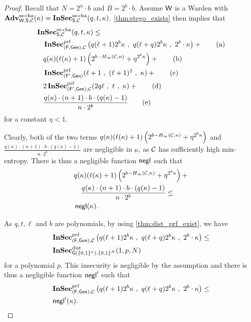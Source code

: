  \begin{proof}
  Recall that $N=2^{n}\cdot b$ and $B=2^{b}\cdot b$.
   Assume  $\operatorname{\mathsf{W}}$ is a Warden with
   $\operatorname{\mathbf{Adv}}^{\operatorname{ss-cha}}_{\operatorname{\mathsf{W}},\operatorname{\mathsf{S}},\mathcal{C}}(\kappa)=\operatorname{\mathbf{InSec}}^{\operatorname{ss-cha}}_{\operatorname{\mathsf{S}},\mathcal{C}}(q,t,\kappa)$. 
   \autoref{thm:stego_exists} then implies that
    \begin{align*}
      &\InSec^{\sscha}_{\Steg,\chan}(q,t,\kappa) \leq\\
      &\quad \InSec^{\prf}_{(\algf,\Gen),\chan}\left(q(\ell+1)2^{b}\kappa\ ,\
        q(\ell+q)2^{b}\kappa\ ,\ 2^{b}\cdot \kappa\right)+ \tag{a}\\
      &\quad q(\kappa)(\ell(\kappa)+1)\left(2^{b-\minent(\chan,n)}+\eta^{2^{b}\kappa}\right)+\tag{b}\\
      &\quad \InSec^{\prf}_{(\algf',\Gen)}(\ell+1\ ,\ (\ell+1)^{2}\ ,\ \kappa)  +\tag{c}\\
      &\quad 2\InSec^{\prf}_{(\algf',\Gen),\chan}(2q\ell\ ,\ t\ ,\ \kappa) +\tag{d}\\
      &\quad \frac{q(\kappa)\cdot (n+1)\cdot b\cdot 
        (q(\kappa)-1)}{n\cdot 2^{b}} \tag{e}
    \end{align*}
    for a constant $\eta < 1$. 

    Clearly, both of the two terms
    $q(\kappa)(\ell(\kappa)+1)\left(2^{b-H_{\infty}(\mathcal{C},n)}+\eta^{2^{b}\kappa}\right)$
    and
    $\frac{q(\kappa)\cdot (n+1)\cdot b\cdot (q(\kappa)-1)}{n\cdot
      2^{b}}$ are negligible in $\kappa$, as $\mathcal{C}$ has sufficiently high
    min-entropy. There is thus a negligible function $\operatorname{\mathsf{negl}}$ such that
 \begin{align*}
   &q(\kappa)(\ell(\kappa)+1)\left(2^{b-H_{\infty}(\mathcal{C},n)}+\eta^{2^{b}\kappa}\right)+\\
   &\quad\frac{q(\kappa)\cdot (n+1)\cdot b\cdot 
        (q(\kappa)-1)}{n\cdot 2^{b}} \leq\\
   &\operatorname{\mathsf{negl}}(\kappa).
 \end{align*}

 As $q,t,\ell$ and $b$ are polynomials, by using
 \autoref{thm:dist_prf_exist}, we have
 \begin{align*}
      &\InSec^{\prf}_{(\algf,\Gen),\chan}\left(q(\ell+1)2^{b}\kappa\ ,\
        q(\ell+q)2^{b}\kappa\ ,\ 2^{b}\cdot \kappa\right)\leq\\
   &\InSec^{\dist}_{\algo{G}(\{0,1\}^{\kappa}),\{0,1\}^{N}}(1,p,N)
 \end{align*}
for a polynomial $p$.
This insecurity is negligible by the assumption and there is thus a
negligible function $\operatorname{\mathsf{negl}}'$ such that
\begin{align*}
      &\InSec^{\prf}_{(\algf,\Gen),\chan}\left(q(\ell+1)2^{b}\kappa\ ,\
        q(\ell+q)2^{b}\kappa\ ,\ 2^{b}\cdot \kappa\right)\leq\\
      &\negl'(\kappa).
\end{align*}


\end{proof}

